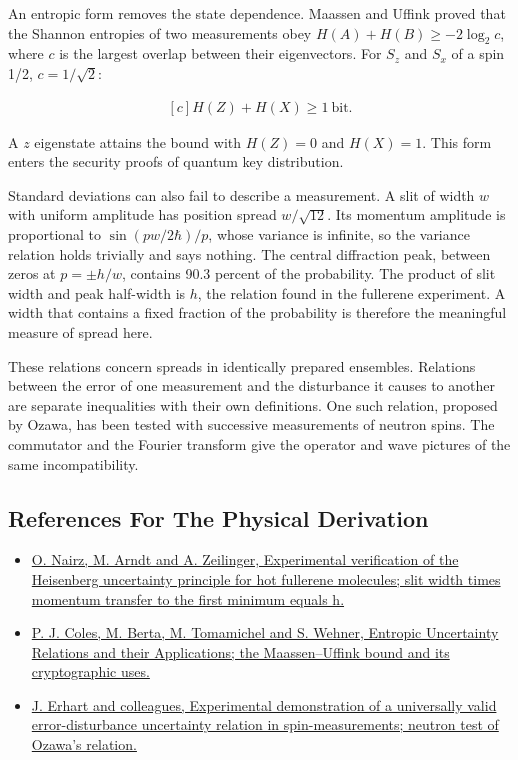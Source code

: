 \documentclass[11pt,oneside]{book}
\newenvironment{centeredalign}{\[\begin{gathered}[c]}{\end{gathered}\]}
\begin{document}
An entropic form removes the state dependence. Maassen and Uffink proved that the Shannon entropies of two measurements obey \(H(A)+H(B)\geq-2\log_2c\), where \(c\) is the largest overlap between their eigenvectors. For \(S_z\) and \(S_x\) of a spin 1/2, \(c=1/\sqrt2\):

\begin{centeredalign}
H(Z)+H(X)\geq1\ \text{bit}.
\end{centeredalign}

A \(z\) eigenstate attains the bound with \(H(Z)=0\) and \(H(X)=1\). This form enters the security proofs of quantum key distribution.

Standard deviations can also fail to describe a measurement. A slit of width \(w\) with uniform amplitude has position spread \(w/\sqrt{12}\). Its momentum amplitude is proportional to \(\sin(pw/2\hbar)/p\), whose variance is infinite, so the variance relation holds trivially and says nothing. The central diffraction peak, between zeros at \(p=\pm h/w\), contains 90.3 percent of the probability. The product of slit width and peak half-width is \(h\), the relation found in the fullerene experiment. A width that contains a fixed fraction of the probability is therefore the meaningful measure of spread here.

These relations concern spreads in identically prepared ensembles. Relations between the error of one measurement and the disturbance it causes to another are separate inequalities with their own definitions. One such relation, proposed by Ozawa, has been tested with successive measurements of neutron spins. The commutator and the Fourier transform give the operator and wave pictures of the same incompatibility.

\subsection*{References For The Physical Derivation}
\begin{itemize}
\item \href{https://arxiv.org/abs/quant-ph/0105061}{O. Nairz, M. Arndt and A. Zeilinger, Experimental verification of the Heisenberg uncertainty principle for hot fullerene molecules; slit width times momentum transfer to the first minimum equals h.}
\item \href{https://arxiv.org/abs/1511.04857}{P. J. Coles, M. Berta, M. Tomamichel and S. Wehner, Entropic Uncertainty Relations and their Applications; the Maassen--Uffink bound and its cryptographic uses.}
\item \href{https://arxiv.org/abs/1201.1833}{J. Erhart and colleagues, Experimental demonstration of a universally valid error-disturbance uncertainty relation in spin-measurements; neutron test of Ozawa's relation.}
\end{itemize}
\end{document}
